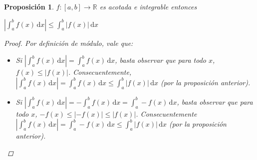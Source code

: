 \documentclass[]{article}
\newtheorem{prop}[teo]{Proposición}
\def\R{\mathbb{R}}
\newcommand{\integral}[4]{\int_{#1}^{#2} \! #3 \, \mathrm{d}#4}
\begin{document}
\begin{prop}
	$f:[a,b]\to \R$ es acotada e integrable entonces 
	\begin{center}
		$\displaystyle \left|\integral{a}{b}{f(x)}{x}\right| \leq \integral{a}{b}{\left|f(x)\right|}{x}$
	\end{center}
	\begin{proof}
		Por definición de módulo, vale que:
		\begin{itemize}
			\item Si $|\integral{a}{b}{f(x)}{x}| = \integral{a}{b}{f(x)}{x}$, basta observar que para todo $x$, $f(x) \leq |f(x)|$. Consecuentemente, $|\integral{a}{b}{f(x)}{x}| = \integral{a}{b}{f(x)}{x} \leq \integral{a}{b}{|f(x)|}{x}$ (por la proposición anterior).
			
			\item Si $|\integral{a}{b}{f(x)}{x}| = -\integral{a}{b}{f(x)}{x} = \integral{a}{b}{-f(x)}{x}$, basta observar que para todo $x$, $-f(x) \leq |-f(x)| \leq |f(x)|$. Consecuentemente $|\integral{a}{b}{f(x)}{x}| = \integral{a}{b}{-f(x)}{x} \leq \integral{a}{b}{|f(x)|}{x}$ (por la proposición anterior).
		\end{itemize}
	\end{proof}
\end{prop}
\end{document}
